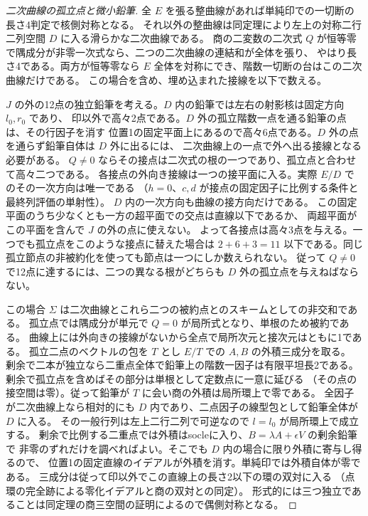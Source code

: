 \begin{proof}[二次曲線の孤立点と微小鉛筆]
全 $E$ を張る整曲線があれば単純印での一切断の長さ4判定で核側対称となる。
それ以外の整曲線は同定理により左上の対称二行二列空間 $D$ に入る滑らかな二次曲線である。
商の二変数の二次式 $Q$ が恒等零で隅成分が非零一次式なら、二つの二次曲線の連結和が全体を張り、
やはり長さ4である。両方が恒等零なら $E$ 全体を対称にでき、階数一切断の台はこの二次曲線だけである。
この場合を含め、埋め込まれた接線を以下で数える。

$J$ の外の12点の独立鉛筆を考える。$D$ 内の鉛筆では左右の射影核は固定方向 $l_0,r_0$ であり、
印以外で高々2点である。$D$ 外の孤立階数一点を通る鉛筆の点は、その行因子を消す
位置1の固定平面上にあるので高々6点である。$D$ 外の点を通らず鉛筆自体は $D$ 外に出るには、
二次曲線上の一点で外へ出る接線となる必要がある。
$Q\ne0$ ならその接点は二次式の根の一つであり、孤立点と合わせて高々二つである。
各接点の外向き接線は一つの接平面に入る。実際 $E/D$ でのその一次方向は唯一である
（$h=0$、$c,d$ が接点の固定因子に比例する条件と最終列評価の単射性）。
$D$ 内の一次方向も曲線の接方向だけである。
この固定平面のうち少なくとも一方の超平面での交点は直線以下であるか、
両超平面がこの平面を含んで $J$ の外の点に使えない。
よって各接点は高々3点を与える。一つでも孤立点をこのような接点に替えた場合は
$2+6+3=11$ 以下である。同じ孤立節点の非被約化を使っても節点は一つにしか数えられない。
従って $Q\ne0$ で12点に達するには、二つの異なる根がどちらも $D$ 外の孤立点を与えねばならない。

この場合 $\Sigma$ は二次曲線とこれら二つの被約点とのスキームとしての非交和である。
孤立点では隅成分が単元で $Q=0$ が局所式となり、単根のため被約である。
曲線上には外向きの接線がないから全点で局所次元と接次元はともに1である。
孤立二点のベクトルの包を $T$ とし $E/T$ での $A,B$ の外積三成分を取る。
剰余で二本が独立なら二重点全体で鉛筆上の階数一因子は有限平坦長2である。
剰余で孤立点を含めばその部分は単根として定数点に一意に延びる
（その点の接空間は零）。従って鉛筆が $T$ に会い商の外積は局所環上で零である。
全因子が二次曲線上なら相対的にも $D$ 内であり、二点因子の線型包として鉛筆全体が $D$ に入る。
その一般行列は左上二行二列で可逆なので $l=l_0$ が局所環上で成立する。
剰余で比例する二重点では外積はsocleに入り、$B=\lambda A+\epsilon V$ の剰余鉛筆で
非零のずれだけを調べればよい。そこでも $D$ 内の場合に限り外積に寄与し得るので、
位置1の固定直線のイデアルが外積を消す。単純印では外積自体が零である。
三成分は従って印以外でこの直線上の長さ2以下の環の双対に入る
（点環の完全跡による零化イデアルと商の双対との同定）。
形式的には三つ独立であることは同定理の商三空間の証明によるので偶側対称となる。


\end{proof}

